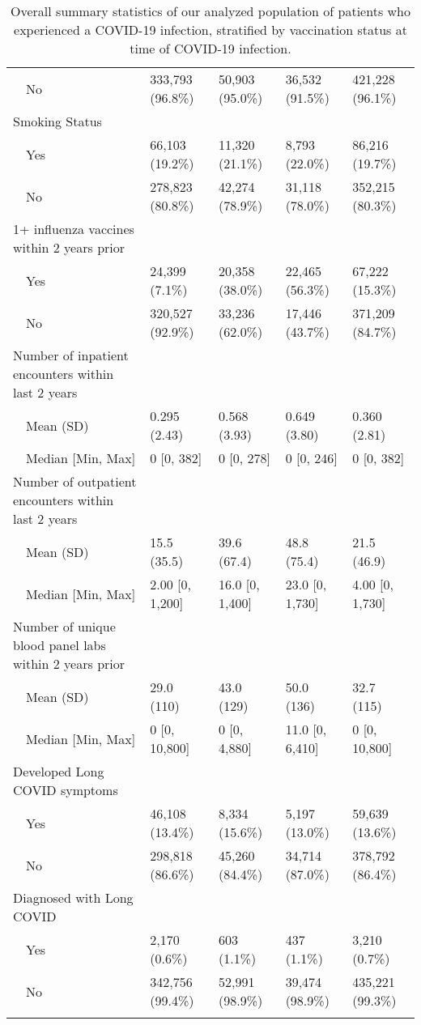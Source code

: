 \begin{longtable}{lllll}
    No & 333,793 (96.8\%) & 50,903 (95.0\%) & 36,532 (91.5\%) & 421,228 (96.1\%) \\ 
  Smoking Status &  &  &  &  \\ 
    Yes & 66,103 (19.2\%) & 11,320 (21.1\%) & 8,793 (22.0\%) & 86,216 (19.7\%) \\ 
    No & 278,823 (80.8\%) & 42,274 (78.9\%) & 31,118 (78.0\%) & 352,215 (80.3\%) \\ 
  1+ influenza vaccines within 2 years prior &  &  &  &  \\ 
    Yes & 24,399 (7.1\%) & 20,358 (38.0\%) & 22,465 (56.3\%) & 67,222 (15.3\%) \\ 
    No & 320,527 (92.9\%) & 33,236 (62.0\%) & 17,446 (43.7\%) & 371,209 (84.7\%) \\ 
  Number of inpatient encounters within last 2 years &  &  &  &  \\ 
    Mean (SD) & 0.295 (2.43) & 0.568 (3.93) & 0.649 (3.80) & 0.360 (2.81) \\ 
    Median [Min, Max] & 0 [0, 382] & 0 [0, 278] & 0 [0, 246] & 0 [0, 382] \\ 
  Number of outpatient encounters within last 2 years &  &  &  &  \\ 
    Mean (SD) & 15.5 (35.5) & 39.6 (67.4) & 48.8 (75.4) & 21.5 (46.9) \\ 
    Median [Min, Max] & 2.00 [0, 1,200] & 16.0 [0, 1,400] & 23.0 [0, 1,730] & 4.00 [0, 1,730] \\ 
  Number of unique blood panel labs within 2 years prior &  &  &  &  \\ 
    Mean (SD) & 29.0 (110) & 43.0 (129) & 50.0 (136) & 32.7 (115) \\ 
    Median [Min, Max] & 0 [0, 10,800] & 0 [0, 4,880] & 11.0 [0, 6,410] & 0 [0, 10,800] \\ 
  Developed Long COVID symptoms &  &  &  &  \\ 
    Yes & 46,108 (13.4\%) & 8,334 (15.6\%) & 5,197 (13.0\%) & 59,639 (13.6\%) \\ 
    No & 298,818 (86.6\%) & 45,260 (84.4\%) & 34,714 (87.0\%) & 378,792 (86.4\%) \\ 
  Diagnosed with Long COVID &  &  &  &  \\ 
    Yes & 2,170 (0.6\%) & 603 (1.1\%) & 437 (1.1\%) & 3,210 (0.7\%) \\ 
    No & 342,756 (99.4\%) & 52,991 (98.9\%) & 39,474 (98.9\%) & 435,221 (99.3\%) \\ 
  \hline
\caption{Overall summary statistics of our analyzed population of patients who experienced a COVID-19 infection, stratified by vaccination status at time of COVID-19 infection.} 
\label{tab:table_1}
\end{longtable}
